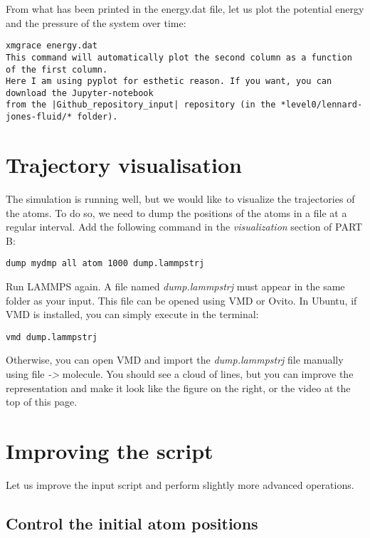 \noindent From what has been printed in the energy.dat file, let us
plot the potential energy and the pressure of
the system over time:

\begin{verbatim}
xmgrace energy.dat
This command will automatically plot the second column as a function of the first column.
Here I am using pyplot for esthetic reason. If you want, you can download the Jupyter-notebook
from the |Github_repository_input| repository (in the *level0/lennard-jones-fluid/* folder).
\end{verbatim}

\section{Trajectory visualisation}
\noindent 
The simulation is running well, but we would like to
visualize the trajectories of the atoms. To do so, we need
to dump the positions of the atoms in a file at a regular
interval. Add the following command in the \textit{visualization}
section of PART B:

\begin{verbatim}
dump mydmp all atom 1000 dump.lammpstrj
\end{verbatim}

\noindent Run LAMMPS again. A file named \textit{dump.lammpstrj} must appear in
the same folder as your input. This file can be opened using
VMD or Ovito. In Ubuntu, if VMD is installed, you can simply
execute in the terminal:

\begin{verbatim}
vmd dump.lammpstrj
\end{verbatim}

\noindent Otherwise, you can open VMD and import the \textit{dump.lammpstrj}
file manually using file \textit{->} molecule. You should see a cloud
of lines, but you can improve the representation and make it
look like the figure on the right, or the video at the 
top of this page. 

\section{Improving the script}

Let us improve the input script and perform slightly more
advanced operations.

\subsection{Control the initial atom positions}

